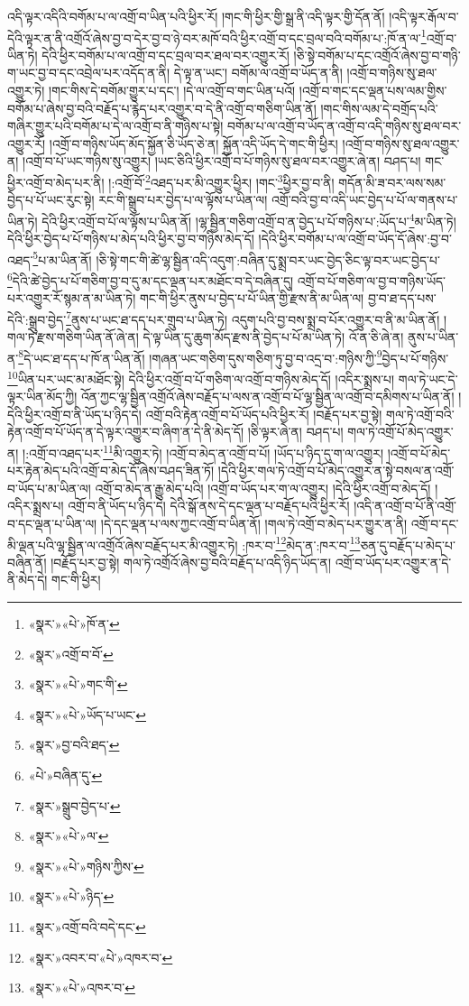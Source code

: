 འདི་ལྟར་འདིའི་བགོམ་པ་ལ་འགྲོ་བ་ཡིན་པའི་ཕྱིར་རོ། །གང་གི་ཕྱིར་གྱི་སྒྲ་ནི་འདི་ལྟར་གྱི་དོན་ནོ། །འདི་ལྟར་རྒོལ་བ་དེའི་ལྟར་ན་ནི་འགྲོའོ་ཞེས་བྱ་བ་དེར་བྱ་བ་ཉེ་བར་མཁོ་བའི་ཕྱིར་འགྲོ་བ་དང་བྲལ་བའི་བགོམ་པ་:ཁོ་ན་ལ་\footnote{«སྣར་»«པེ་»ཁོ་ན་}འགྲོ་བ་ཡིན་ཏེ། དེའི་ཕྱིར་བགོམ་པ་ལ་འགྲོ་བ་དང་བྲལ་བར་ཐལ་བར་འགྱུར་རོ། །ཅི་སྟེ་བགོམ་པ་དང་འགྲོའོ་ཞེས་བྱ་བ་གཉི་ག་ཡང་བྱ་བ་དང་འབྲེལ་པར་འདོད་ན་ནི། དེ་ལྟ་ན་ཡང་། བགོམ་ལ་འགྲོ་བ་ཡོད་ན་ནི། །འགྲོ་བ་གཉིས་སུ་ཐལ་འགྱུར་ཏེ། །གང་གིས་དེ་བགོམ་གྱུར་པ་དང་། །དེ་ལ་འགྲོ་བ་གང་ཡིན་པའོ། །འགྲོ་བ་གང་དང་ལྡན་པས་ལམ་གྱིས་བགོམ་པ་ཞེས་བྱ་བའི་བརྗོད་པ་རྙེད་པར་འགྱུར་བ་དེ་ནི་འགྲོ་བ་གཅིག་ཡིན་ནོ། །གང་གིས་ལམ་དེ་བགྲོད་པའི་གཞིར་གྱུར་པའི་བགོམ་པ་དེ་ལ་འགྲོ་བ་ནི་གཉིས་པ་སྟེ། བགོམ་པ་ལ་འགྲོ་བ་ཡོད་ན་འགྲོ་བ་འདི་གཉིས་སུ་ཐལ་བར་འགྱུར་རོ། །འགྲོ་བ་གཉིས་ཡོད་མོད་སྐྱོན་ཅི་ཡོད་ཅེ་ན། སྐྱོན་འདི་ཡོད་དེ་གང་གི་ཕྱིར། །འགྲོ་བ་གཉིས་སུ་ཐལ་འགྱུར་ན། །འགྲོ་བ་པོ་ཡང་གཉིས་སུ་འགྱུར། །ཡང་ཅིའི་ཕྱིར་འགྲོ་བ་པོ་གཉིས་སུ་ཐལ་བར་འགྱུར་ཞེ་ན། བཤད་པ། གང་ཕྱིར་འགྲོ་བ་མེད་པར་ནི། །:འགྲོ་བོ་\footnote{«སྣར་»འགྲོ་བ་བོ་}འཐད་པར་མི་འགྱུར་ཕྱིར། །གང་\footnote{«སྣར་»«པེ་»གང་གི་}ཕྱིར་བྱ་བ་ནི། གདོན་མི་ཟ་བར་ལས་སམ་བྱེད་པ་པོ་ཡང་རུང་སྟེ། རང་གི་སྒྲུབ་པར་བྱེད་པ་ལ་ལྟོས་པ་ཡིན་ལ། འགྲོ་བའི་བྱ་བ་འདི་ཡང་བྱེད་པ་པོ་ལ་གནས་པ་ཡིན་ཏེ། དེའི་ཕྱིར་འགྲོ་བ་པོ་ལ་ལྟོས་པ་ཡིན་ནོ། །ལྷ་སྦྱིན་གཅིག་འགྲོ་བ་ན་བྱེད་པ་པོ་གཉིས་པ་:ཡོད་པ་\footnote{«སྣར་»«པེ་»ཡོད་པ་ཡང་}མ་ཡིན་ཏེ། དེའི་ཕྱིར་བྱེད་པ་པོ་གཉིས་པ་མེད་པའི་ཕྱིར་བྱ་བ་གཉིས་མེད་དོ། །དེའི་ཕྱིར་བགོམ་པ་ལ་འགྲོ་བ་ཡོད་དོ་ཞེས་:བྱ་བ་འཐད་\footnote{«སྣར་»བྱ་བའི་ཐད་}པ་མ་ཡིན་ནོ། །ཅི་སྟེ་གང་གི་ཚེ་ལྷ་སྦྱིན་འདི་འདུག་:བཞིན་དུ་སྨྲ་བར་ཡང་བྱེད་ཅིང་ལྟ་བར་ཡང་བྱེད་པ་\footnote{«པེ་»བཞིན་དུ་}དེའི་ཚེ་བྱེད་པ་པོ་གཅིག་བྱ་བ་དུ་མ་དང་ལྡན་པར་མཐོང་བ་དེ་བཞིན་དུ། འགྲོ་བ་པོ་གཅིག་ལ་བྱ་བ་གཉིས་ཡོད་པར་འགྱུར་རོ་སྙམ་ན་མ་ཡིན་ཏེ། གང་གི་ཕྱིར་ནུས་པ་བྱེད་པ་པོ་ཡིན་གྱི་རྫས་ནི་མ་ཡིན་ལ། བྱ་བ་ཐ་དད་པས་དེའི་:སྒྲུབ་བྱེད་\footnote{«སྣར་»སྒྲུབ་བྱེད་པ་}ནུས་པ་ཡང་ཐ་དད་པར་གྲུབ་པ་ཡིན་ཏེ། འདུག་པའི་བྱ་བས་སྨྲ་བ་པོར་འགྱུར་བ་ནི་མ་ཡིན་ནོ། །གལ་ཏེ་རྫས་གཅིག་ཡིན་ནོ་ཞེ་ན། དེ་ལྟ་ཡིན་དུ་ཆུག་མོད་རྫས་ནི་བྱེད་པ་པོ་མ་ཡིན་ཏེ། འོ་ན་ཅི་ཞེ་ན། ནུས་པ་ཡིན་ན་\footnote{«སྣར་»«པེ་»ལ་}དེ་ཡང་ཐ་དད་པ་ཁོ་ན་ཡིན་ནོ། །གཞན་ཡང་གཅིག་དུས་གཅིག་ཏུ་བྱ་བ་འདྲ་བ་:གཉིས་ཀྱི་\footnote{«སྣར་»«པེ་»གཉིས་ཀྱིས་}བྱེད་པ་པོ་གཉིས་\footnote{«སྣར་»«པེ་»ཉིད་}ཡིན་པར་ཡང་མ་མཐོང་སྟེ། དེའི་ཕྱིར་འགྲོ་བ་པོ་གཅིག་ལ་འགྲོ་བ་གཉིས་མེད་དོ། །འདིར་སྨྲས་པ། གལ་ཏེ་ཡང་དེ་ལྟར་ཡིན་མོད་ཀྱི། འོན་ཀྱང་ལྷ་སྦྱིན་འགྲོའོ་ཞེས་བརྗོད་པ་ལས་ན་འགྲོ་བ་པོ་ལྷ་སྦྱིན་ལ་འགྲོ་བ་དམིགས་པ་ཡིན་ནོ། །དེའི་ཕྱིར་འགྲོ་བ་ནི་ཡོད་པ་ཉིད་དེ། འགྲོ་བའི་རྟེན་འགྲོ་བ་པོ་ཡོད་པའི་ཕྱིར་རོ། །བརྗོད་པར་བྱ་སྟེ། གལ་ཏེ་འགྲོ་བའི་རྟེན་འགྲོ་བ་པོ་ཡོད་ན་དེ་ལྟར་འགྱུར་བ་ཞིག་ན་དེ་ནི་མེད་དོ། །ཅི་ལྟར་ཞེ་ན། བཤད་པ། གལ་ཏེ་འགྲོ་པོ་མེད་འགྱུར་ན། །:འགྲོ་བ་འཐད་པར་\footnote{«སྣར་»འགྲོ་བའི་བདེ་དང་}མི་འགྱུར་ཏེ། །འགྲོ་བ་མེད་ན་འགྲོ་བ་པོ། །ཡོད་པ་ཉིད་དུ་ག་ལ་འགྱུར། །འགྲོ་བ་པོ་མེད་པར་རྟེན་མེད་པའི་འགྲོ་བ་མེད་དོ་ཞེས་བཤད་ཟིན་ཏོ། །དེའི་ཕྱིར་གལ་ཏེ་འགྲོ་བ་པོ་མེད་འགྱུར་ན་སྟེ་བསལ་ན་འགྲོ་བ་ཡོད་པ་མ་ཡིན་ལ། འགྲོ་བ་མེད་ན་རྒྱུ་མེད་པའི། །འགྲོ་བ་ཡོད་པར་ག་ལ་འགྱུར། །དེའི་ཕྱིར་འགྲོ་བ་མེད་དོ། །འདིར་སྨྲས་པ། འགྲོ་བ་ནི་ཡོད་པ་ཉིད་དེ། དེའི་སྒོ་ནས་དེ་དང་ལྡན་པ་བརྗོད་པའི་ཕྱིར་རོ། །འདི་ན་འགྲོ་བ་པོ་ནི་འགྲོ་བ་དང་ལྡན་པ་ཡིན་ལ། །དེ་དང་ལྡན་པ་ལས་ཀྱང་འགྲོ་བ་ཡིན་ནོ། །གལ་ཏེ་འགྲོ་བ་མེད་པར་གྱུར་ན་ནི། འགྲོ་བ་དང་མི་ལྡན་པའི་ལྷ་སྦྱིན་ལ་འགྲོའོ་ཞེས་བརྗོད་པར་མི་འགྱུར་ཏེ། :ཁར་བ་\footnote{«སྣར་»འབར་བ་«པེ་»འཁར་བ་}མེད་ན་:ཁར་བ་\footnote{«སྣར་»«པེ་»འཁར་བ་}ཅན་དུ་བརྗོད་པ་མེད་པ་བཞིན་ནོ། །བརྗོད་པར་བྱ་སྟེ། གལ་ཏེ་འགྲོའོ་ཞེས་བྱ་བའི་བརྗོད་པ་འདི་ཉིད་ཡོད་ན། འགྲོ་བ་ཡོད་པར་འགྱུར་ན་དེ་ནི་མེད་དེ། གང་གི་ཕྱིར། 